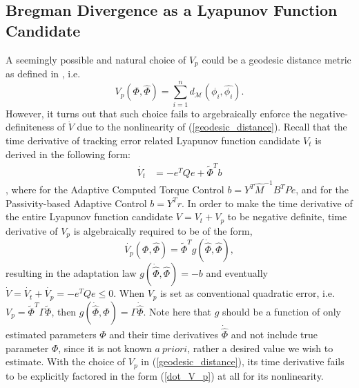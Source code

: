 \documentclass[letterpaper, 10 pt, conference]{ieeeconf}  %
\begin{document}
\subsection{Bregman Divergence as a Lyapunov Function Candidate}
A seemingly possible and natural choice of $V_{p}$ could be a geodesic distance metric as defined in \cite{Taeyoon_RAL}, i.e. 
\begin{equation}
V_{p}(\Phi,\hat{\Phi}) = \sum_{i=1}^{n} d_{\mathcal{M}}(\phi_{i}, \hat{\phi_{i}}). \label{geodesic_distance}
\end{equation}
However, it turns out that such choice fails to argebraically enforce the negative-definiteness of $\dot{V}$ due to the nonlinearity of (\ref{geodesic_distance}). Recall that the time derivative of tracking error related Lyapunov function candidate $V_{t}$ is derived in the following form:
\begin{align}
\dot{V_t} &= -e^{T}Qe +\tilde{\Phi}^{T}b \label{dot_V_t}
\end{align}
, where for the Adaptive Computed Torque Control $b = Y^T\hat{M}^{-1}B^{T}Pe$, and for the Passivity-based Adaptive Control $b = Y^{T}r$. In order to make the time derivative of the entire Lyapunov function candidate $V = V_{t}+V_{p}$ to be negative definite, time derivative of $V_{p}$ is algebraically required to be of the form,
\begin{equation}
\dot{V_{p}}(\Phi, \hat{\Phi})=\tilde{\Phi}^{T}g(\dot{\hat{\Phi}}, \hat{\Phi}) \label{dot_V_p},
\end{equation}
resulting in the adaptation law $g(\dot{\hat{\Phi}}, \hat{\Phi}) = - b$ and eventually $\dot{V} =\dot{V_{t}}+\dot{V_{p}}= -e^{T}Qe \leq 0$. When $V_{p}$ is set as conventional quadratic error, i.e. $V_{p} = \tilde{\Phi}^{T}\Gamma\tilde{\Phi}$, then $g(\dot{\hat{\Phi}}, \hat{\Phi}) = \Gamma \dot{\hat{\Phi}}$. Note here that $g$ should be a function of only estimated parameters $\hat{\Phi}$ and their time derivatives $\dot{\hat{\Phi}}$ and not include true parameter $\Phi$, since it is not known $a \ priori$, rather a desired value we wish to estimate. With the choice of $V_{p}$ in (\ref{geodesic_distance}), its time derivative fails to be explicitly factored in the form (\ref{dot_V_p}) at all for its nonlinearity.
\end{document}
